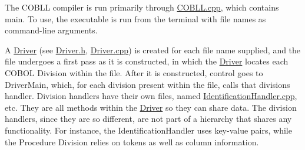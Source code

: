 The COBLL compiler is run primarily through {\ttfamily \mbox{\hyperlink{_c_o_b_l_l_8cpp}{COBLL.\+cpp}}}, which contains {\ttfamily main}. To use, the executable is run from the terminal with file names as command-\/line arguments.

A \mbox{\hyperlink{class_driver}{Driver}} (see {\ttfamily \mbox{\hyperlink{_driver_8h}{Driver.\+h}}}, {\ttfamily \mbox{\hyperlink{_driver_8cpp}{Driver.\+cpp}}}) is created for each file name supplied, and the file undergoes a first pass as it is constructed, in which the \mbox{\hyperlink{class_driver}{Driver}} locates each COBOL Division within the file. After it is constructed, control goes to {\ttfamily Driver\+Main}, which, for each division present within the file, calls that division\textquotesingle{}s handler. Division handlers have their own files, named {\ttfamily \mbox{\hyperlink{_identification_handler_8cpp}{Identification\+Handler.\+cpp}}}, etc. They are all methods within the \mbox{\hyperlink{class_driver}{Driver}} so they can share data. The division handlers, since they are so different, are not part of a hierarchy that shares any functionality. For instance, the Identification\+Handler uses key-\/value pairs, while the Procedure Division relies on tokens as well as column information. 